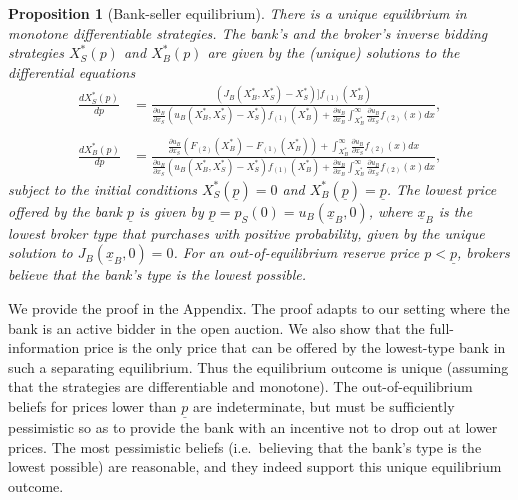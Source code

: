 \documentclass[11pt,twopage]{article}
\newcommand{\ul}{\underline}
\newtheorem{proposition}{Proposition}
{\bf}{\it}
\begin{document}
\begin{proposition}[Bank-seller equilibrium]\label{prop:nonjudicial}
  There is a unique equilibrium in monotone differentiable
  strategies. The bank's and the broker's 
  inverse bidding strategies $X_S^*(p)$ and $X_B^*(p)$ are given by the (unique)
  solutions to the differential equations 
  \begin{align}
 \frac{d X_S^*(p)}{dp}&= 
  \frac{(J_B(X_B^*,X_S^*)-X_S^*)]f_{(1)}(X_B^*)}{
  \frac{\partial u_B}{\partial x_S}
   (u_B(X_B^*,X_S^*)-X_S^*)f_{(1)}(X_B^*)+
   \frac{ \partial u_B}{\partial x_B }
    \int_{X_B^*}^\infty \frac{  \partial u_B} {\partial x_S} 
    f_{(2)}(x) dx
    },\label{eq:sdifeq}
    \\ \nonumber
    \\
  \frac{d X_B^*(p)}{dp}&= 
  \frac{ \frac{  \partial u_B} {\partial x_S}( F_{(2)}(X_B^*) -  F_{(1)}(X_B^*)) +  \int_{X_B^*}^\infty \frac{  \partial u_B} {\partial x_S} 
    f_{(2)}(x) dx  }{
  \frac{\partial u_B}{\partial x_S}
   (u_B(X_B^*,X_S^*)-X_S^*)f_{(1)}(X_B^*)+
   \frac{ \partial u_B}{\partial x_B }
    \int_{X_B^*}^\infty \frac{  \partial u_B} {\partial x_S} 
    f_{(2)}(x) dx \label{eq:bdifeq}
    }   ,
\end{align}
subject to the initial conditions $X_S^*(\ul p) =
  0$ and $X_B^*(\ul p) = \ul p$.  The lowest price offered by the
  bank $\ul p$ is given by $ \ul p = p_S(0) = u_B(\ul x_B, 0)$, where $\ul x_B$  is the lowest broker type that  purchases with positive probability, given by the unique
  solution to $J_B(\ul x_B,0) = 0$.
For an out-of-equilibrium reserve price $p<\ul p$, brokers believe
  that the bank's type is the lowest possible.
\end{proposition}
We provide the proof in the Appendix. The proof adapts  \cite{cai2007reserve} to our setting where the bank is an active bidder in the open auction. We also show that the full-information price is the only price that can be offered by the lowest-type bank in such a separating equilibrium. Thus the equilibrium outcome is unique  (assuming that the strategies are differentiable and monotone). The out-of-equilibrium beliefs for prices lower than $\underline p$ are indeterminate, but must be sufficiently pessimistic so as to provide the bank with an incentive not to drop out at lower prices. The most pessimistic beliefs (i.e.\, believing that the bank's type is the lowest possible) are reasonable, and they indeed support this unique equilibrium outcome.
\end{document}
